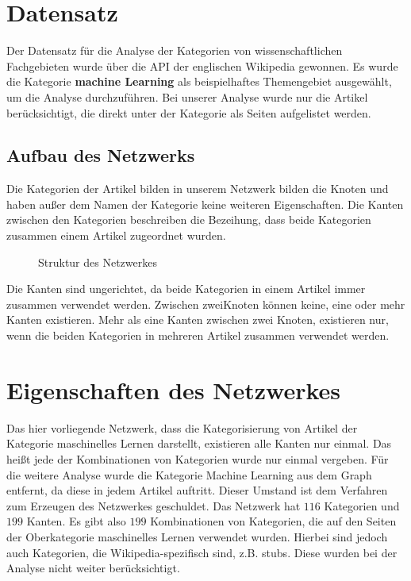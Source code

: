 \documentclass{acm_proc_article-sp}
\begin{document}
\section{Datensatz}
Der Datensatz für die Analyse der Kategorien von wissenschaftlichen Fachgebieten wurde über die API der englischen Wikipedia gewonnen. Es wurde die Kategorie \textbf{machine Learning} als beispielhaftes Themengebiet ausgewählt, um die Analyse durchzuführen. Bei unserer Analyse wurde nur die Artikel berücksichtigt, die direkt unter der Kategorie als Seiten aufgelistet werden.

\subsection{Aufbau des Netzwerks}
Die Kategorien der Artikel bilden in unserem Netzwerk bilden die Knoten und haben außer dem Namen der Kategorie keine weiteren Eigenschaften. Die Kanten zwischen den Kategorien beschreiben die Bezeihung, dass beide Kategorien zusammen einem Artikel zugeordnet wurden. 
\begin{figure}[H]
\centering
{}
\caption{Struktur des Netzwerkes}
\end{figure}
Die Kanten sind ungerichtet, da beide Kategorien in einem Artikel immer zusammen verwendet werden. Zwischen zweiKnoten können keine, eine oder mehr Kanten existieren. Mehr als eine Kanten zwischen zwei Knoten, existieren nur, wenn die beiden Kategorien in mehreren Artikel zusammen verwendet werden.

\section{Eigenschaften des Netzwerkes}
Das hier vorliegende Netzwerk, dass die Kategorisierung von Artikel der Kategorie maschinelles Lernen darstellt, existieren alle Kanten nur einmal. Das heißt jede der Kombinationen von Kategorien wurde nur einmal vergeben.
Für die weitere Analyse wurde die Kategorie Machine Learning aus dem Graph entfernt, da diese in jedem Artikel auftritt. Dieser Umstand ist dem Verfahren zum Erzeugen des Netzwerkes geschuldet. Das Netzwerk hat $116$ Kategorien und $199$ Kanten. Es gibt also $199$ Kombinationen von Kategorien, die auf den Seiten der Oberkategorie maschinelles Lernen verwendet wurden. Hierbei sind jedoch auch Kategorien, die Wikipedia-spezifisch sind, z.B. stubs. Diese wurden bei der Analyse nicht weiter berücksichtigt.
\newpage
\end{document}
